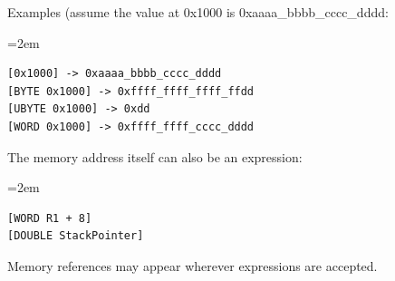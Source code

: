 Examples (assume the value at 0x1000 is 0xaaaa\_bbbb\_cccc\_dddd:

\begin{list}{}{\leftmargin=2em}
\item
\begin{verbatim}
[0x1000] -> 0xaaaa_bbbb_cccc_dddd
[BYTE 0x1000] -> 0xffff_ffff_ffff_ffdd
[UBYTE 0x1000] -> 0xdd
[WORD 0x1000] -> 0xffff_ffff_cccc_dddd
\end{verbatim}
\end{list}

The memory address itself can also be an expression:

\begin{list}{}{\leftmargin=2em}
\item
\begin{verbatim}
[WORD R1 + 8]
[DOUBLE StackPointer]
\end{verbatim}
\end{list}

Memory references may appear wherever expressions are accepted.
